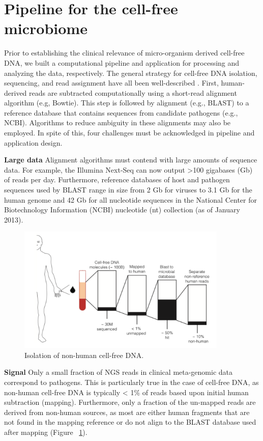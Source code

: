 \section{Pipeline for the cell-free microbiome}

Prior to establishing the clinical relevance of micro-organism derived cell-free DNA, we built a computational pipeline and application for processing and analyzing the data, respectively. The general strategy for cell-free DNA isolation, sequencing, and read assignment have all been well-described \cite{DeVlaminck:2013hl}. First, human-derived reads are subtracted computationally using a short-read alignment algorithm (e.g, Bowtie). This step is followed by alignment (e.g., BLAST) to a reference database that contains sequences from candidate pathogens (e.g., NCBI). Algorithms to reduce ambiguity in these alignments \cite{Xia:2011it} may also be employed. In spite of this, four challenges must be acknowledged in pipeline and application design.

\textbf{Large data} Alignment algorithms must contend with large amounts of sequence data. For example, the Illumina Next-Seq can now output >100 gigabases (Gb) of reads per day. Furthermore, reference databases of host and pathogen sequences used by BLAST range in size from 2 Gb for viruses to 3.1 Gb for the human genome and 42 Gb for all nucleotide sequences in the National Center for Biotechnology Information (NCBI) nucleotide (nt) collection (as of January 2013). 

\begin{figure}
\center\includegraphics[width=100mm,scale=0.5]{Figures/Fig3}
\caption{Isolation of non-human cell-free DNA.}
\label{fig:Fig3}
\end{figure}

\textbf{Signal} Only a small fraction of NGS reads in clinical meta-genomic data correspond to pathogens. This is particularly true in the case of cell-free DNA, as non-human cell-free DNA is typically < 1\% of reads based upon initial human subtraction (mapping). Furthermore, only a fraction of the un-mapped reads are derived from non-human sources, as most are either human fragments that are not found in the mapping reference or do not align to the BLAST database used after mapping (Figure ~\ref{fig:Fig3}). 

